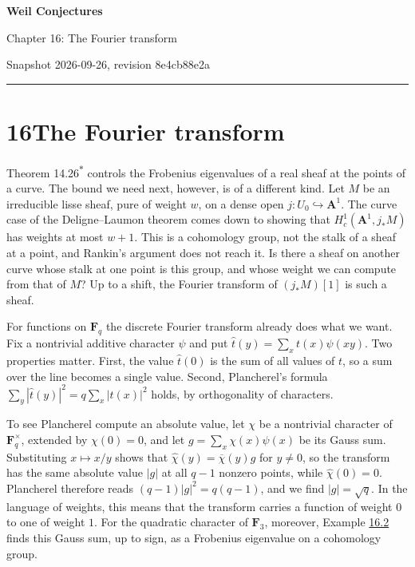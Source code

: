 \documentclass[11pt]{article}
\newcommand{\bpout}[1]{#1\textsuperscript{\hyperlink{bp-outside}{\ensuremath{\ast}}}}
\begin{document}
\pagestyle{plain}
\begin{center}
{\LARGE\bfseries Weil Conjectures\par}
\vspace{0.7em}
{\large Chapter 16: The Fourier transform\par}
\vspace{0.5em}
{\small\color{bpmuted}Snapshot 2026-09-26, revision 8e4cb88e2a\par}
\end{center}
\vspace{0.5em}
{\small\tableofcontents}
\bigskip\hrule\bigskip

\section*{\texorpdfstring{16\quad The Fourier transform}{16 The Fourier transform}}
\label{bp1}%
\label{bp2}%
Theorem \bpout{14.26} controls the Frobenius eigenvalues of a real sheaf at the points of a curve. The bound we need next, however, is of a different kind. Let \(M\) be an irreducible lisse sheaf, pure of weight \(w\), on a dense open \(j:U_0\hookrightarrow\mathbf A^1\). The curve case of the Deligne–Laumon theorem comes down to showing that \(H^1_c(\mathbf A^1,j_*M)\) has weights at most \(w+1\). This is a cohomology group, not the stalk of a sheaf at a point, and Rankin's argument does not reach it. Is there a sheaf on another curve whose stalk at one point is this group, and whose weight we can compute from that of \(M\)? Up to a shift, the Fourier transform of \((j_*M)[1]\) is such a sheaf.

For functions on \(\mathbf F_q\) the discrete Fourier transform already does what we want. Fix a nontrivial additive character \(\psi\) and put \(\hat t(y)=\sum_xt(x)\psi(xy)\). Two properties matter. First, the value \(\hat t(0)\) is the sum of all values of \(t\), so a sum over the line becomes a single value. Second, Plancherel's formula \(\sum_y|\hat t(y)|^2=q\sum_x|t(x)|^2\) holds, by orthogonality of characters.

To see Plancherel compute an absolute value, let \(\chi\) be a nontrivial character of \(\mathbf F_q^\times\), extended by \(\chi(0)=0\), and let \(g=\sum_x\chi(x)\psi(x)\) be its Gauss sum. Substituting \(x\mapsto x/y\) shows that \(\hat\chi(y)=\overline\chi(y)g\) for \(y\ne0\), so the transform has the same absolute value \(|g|\) at all \(q-1\) nonzero points, while \(\hat\chi(0)=0\). Plancherel therefore reads \((q-1)|g|^2=q(q-1)\), and we find \(|g|=\sqrt q\). In the language of weights, this means that the transform carries a function of weight \(0\) to one of weight \(1\). For the quadratic character of \(\mathbf F_3\), moreover, Example \hyperref[bp8]{16.2} finds this Gauss sum, up to sign, as a Frobenius eigenvalue on a cohomology group.
\end{document}
